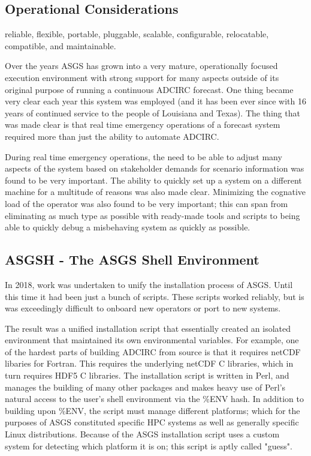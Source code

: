 \documentclass{article}
\begin{document}
\subsection{Operational Considerations}

reliable, flexible, portable, pluggable, scalable, configurable, relocatable, compatible, and maintainable.


Over the years ASGS has grown into a very mature, operationally focused
execution environment with strong support for many aspects outside of its
original purpose of running a continuous ADCIRC forecast. One thing became very
clear each year this system was employed (and it has been ever since with 16
years of continued service to the people of Louisiana and Texas). The thing that
was made clear is that real time emergency operations of a forecast system
required more than just the ability to automate ADCIRC.

During real time emergency operations, the need to be able to adjust many
aspects of the system based on stakeholder demands for scenario information was
found to be very important. The ability to quickly set up a system on a
different machine for a multitude of reasons was also made clear. Minimizing the
cognative load of the operator was also found to be very important; this can
span from eliminating as much type as possible with ready-made tools and scripts
to being able to quickly debug a misbehaving system as quickly as possible.
\subsection{ASGSH - The ASGS Shell Environment}

In 2018, work was undertaken to unify the installation process of ASGS. Until
this time it had been just a bunch of scripts. These scripts worked reliably,
but is was exceedingly difficult to onboard new operators or port to new
systems.

The result was a unified installation script that essentially created an
isolated environment that maintained its own environmental variables. For
example, one of the hardest parts of building ADCIRC from source is that it
requires netCDF libaries for Fortran. This requires the underlying netCDF C
libraries, which in turn requires HDF5 C libraries.  The installation script is
written in Perl, and manages the building of many other packages and makes heavy
use of Perl's natural access to the user's shell environment via the \%ENV hash.
In addition to building upon \%ENV, the script must manage different platforms;
which for the purposes of ASGS constituted specific HPC systems as well as
generally specific Linux distributions. Because of the ASGS installation script
uses a custom system for detecting which platform it is on; this script is aptly
called "guess".
\end{document}
